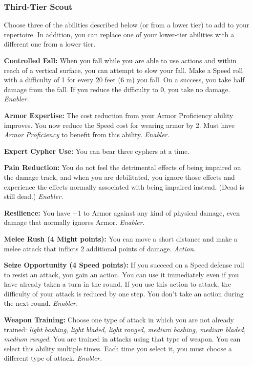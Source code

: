 \documentclass[a4paper,10pt,final,twocolumn,oneside]{book}
\newcommand{\itemAbility}[2]{\textcolor{25gray}{\textbullet\textbf{ #1:}}{ #2}\par}
\newcommand{\enabler}{\textit{ Enabler.}}
\newcommand{\action}{\textit{ Action.}}
\begin{document}

\subsubsection*{Third-Tier Scout}
\label{subsub:scoutThirdTier}

Choose three of the abilities described
below (or from a lower tier) to add to your
repertoire. In addition, you can replace one
of your lower-tier abilities with a different
one from a lower tier.

\itemAbility{Controlled Fall}{When you fall while you are able to use actions and within reach of a vertical surface, you can attempt to slow your fall. Make a Speed roll with a difficulty of 1 for every 20 feet (6 m) you fall. On a success, you take half damage from the fall. If you reduce the difficulty to 0, you take no damage.\enabler}

\itemAbility{Armor Expertise}{The cost reduction from your Armor Proficiency ability improves. You now reduce the Speed cost for wearing armor by 2. Must have \textit{Armor Proficiency} to benefit from this ability.\enabler}

\itemAbility{Expert Cypher Use}{You can bear three cyphers at a time.}

\itemAbility{Pain Reduction}{You do not feel the detrimental effects of being impaired on the damage track, and when you are debilitated, you ignore those effects and experience the effects normally associated with being impaired instead. (Dead is still dead.)\enabler}

\itemAbility{Resilience}{You have +1 to Armor against any kind of physical damage, even damage that normally ignores Armor.\enabler}

\itemAbility{Melee Rush (4 Might points)}{You can move a short distance and make a melee attack that inflicts 2 additional points of damage.\action}

\itemAbility{Seize Opportunity (4 Speed points)}{If you succeed on a Speed defense roll to resist an attack, you gain an action. You can use it immediately even if you have already taken a turn in the round. If you use this action to attack, the difficulty of your attack is reduced by one step. You don’t take an action during the next round. \enabler}

\itemAbility{Weapon Training}{Choose one type of attack in which you are not already trained: \textit{light bashing, light bladed, light ranged, medium bashing, medium bladed, medium ranged}. You are trained in attacks using that type of weapon. You can select this ability multiple times. Each time you select it, you must choose a different type of attack.\enabler}
\end{document}
